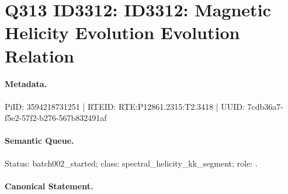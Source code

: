 \section*{Q313 ID3312: ID3312: Magnetic Helicity Evolution Evolution Relation}
\paragraph{Metadata.}
PiID: 3594218731251 | RTEID: RTE:P12861.2315:T2.3418 | UUID: 7cdb36a7-f5e2-57f2-b276-567b832491af

\paragraph{Semantic Queue.}
Status: batch002\_started; class: spectral\_helicity\_kk\_segment; role: .

\paragraph{Canonical Statement.}
